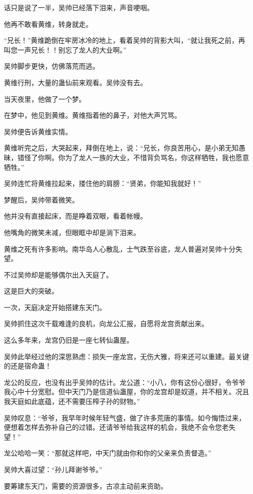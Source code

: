 \begin{this_body}
话只是说了一半，吴帅已经落下泪来，声音哽咽。

他再不敢看黄维，转身就走。

“兄长！”黄维跪倒在牢房冰冷的地上，看着吴帅的背影大叫，“就让我死之前，再叫您一声兄长！！别忘了龙人的大业啊。”

吴帅脚步更快，仿佛落荒而逃。

黄维行刑，大量的蛊仙前来观看。吴帅没有去。

当天夜里，他做了一个梦。

在梦中，他见到黄维。黄维指着他的鼻子，对他大声咒骂。

吴帅便告诉黄维实情。

黄维听完之后，大哭起来，拜倒在地上，说：“兄长，你良苦用心，是小弟无知愚昧，错怪了你啊。你为了龙人一族的大业，不惜背负骂名，你这样牺牲，我也愿意牺牲。”

吴帅连忙将黄维拉起来，搂住他的肩膀：“贤弟，你能知我就好！”

梦醒后，吴帅带着微笑。

他并没有直接起床，而是睁着双眼，看着帐幔。

他嘴角的微笑未减，但眼眶中却是淌下泪来。

黄维之死有许多影响。南华岛人心散乱，士气跌至谷底，龙人普遍对吴帅十分失望。

不过吴帅却是能够偶尔出入天庭了。

这是巨大的突破。

一次，天庭决定开始搭建东天门。

吴帅抓住这次千载难逢的良机，向龙公汇报，自愿将龙宫贡献出来。

这么多年来，龙宫仍旧是一座七转仙蛊屋。

吴帅此举经过他的深思熟虑：损失一座龙宫，无伤大雅，将来还可以重建。最关键的还是宿命蛊！

龙公的反应，也没有出乎吴帅的估计。龙公道：“小八，你有这份心很好，令爷爷我心中十分宽慰。但中天门乃是信道仙蛊屋，你的龙宫却是奴道，并不相关。况且我天庭如此底蕴，还不需要压榨子孙的财物。”

吴帅叹息：“爷爷，我早年时候年轻气盛，做了许多荒唐的事情。如今悔悟过来，便想着怎样去弥补自己的过错。还请爷爷给我这样的机会，我绝不会令您老失望！”

龙公哈哈一笑：“那就这样吧，中天门就由你和你的父亲来负责督造。”

吴帅大喜过望：“孙儿拜谢爷爷。”

要筹建东天门，需要的资源很多，古凉主动前来资助。


\end{this_body}
